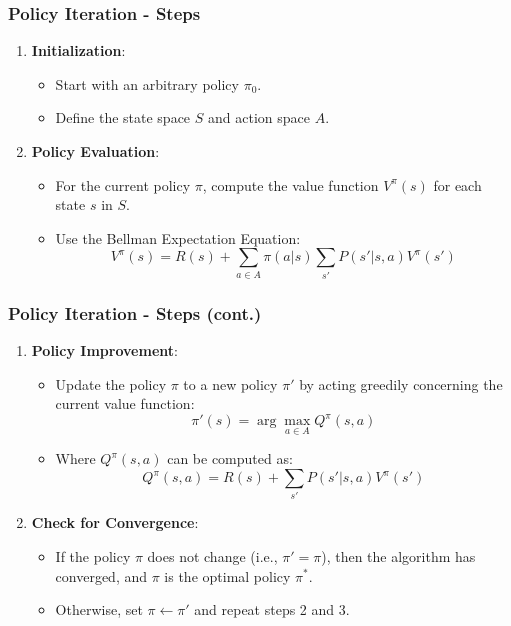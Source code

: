 \documentclass[aspectratio=169]{beamer}
\begin{document}
\begin{frame}[fragile]
    \frametitle{Policy Iteration - Steps}
    \begin{enumerate}
        \item \textbf{Initialization}:
            \begin{itemize}
                \item Start with an arbitrary policy \( \pi_0 \).
                \item Define the state space \( S \) and action space \( A \).
            \end{itemize}
        
        \item \textbf{Policy Evaluation}:
            \begin{itemize}
                \item For the current policy \( \pi \), compute the value function \( V^\pi(s) \) for each state \( s \) in \( S \).
                \item Use the Bellman Expectation Equation:
                \begin{equation}
                V^\pi(s) = R(s) + \sum_{a \in A} \pi(a|s) \sum_{s'} P(s'|s, a) V^\pi(s')
                \end{equation}
            \end{itemize}
    \end{enumerate}
\end{frame}

\begin{frame}[fragile]
    \frametitle{Policy Iteration - Steps (cont.)}
    \begin{enumerate}[resume]
        \item \textbf{Policy Improvement}:
            \begin{itemize}
                \item Update the policy \( \pi \) to a new policy \( \pi' \) by acting greedily concerning the current value function:
                \begin{equation}
                \pi'(s) = \arg\max_{a \in A} Q^\pi(s, a)
                \end{equation}
                \item Where \( Q^\pi(s, a) \) can be computed as:
                \begin{equation}
                Q^\pi(s, a) = R(s) + \sum_{s'} P(s'|s, a) V^\pi(s')
                \end{equation}
            \end{itemize}
        
        \item \textbf{Check for Convergence}:
            \begin{itemize}
                \item If the policy \( \pi \) does not change (i.e., \( \pi' = \pi \)), then the algorithm has converged, and \( \pi \) is the optimal policy \( \pi^* \).
                \item Otherwise, set \( \pi \leftarrow \pi' \) and repeat steps 2 and 3.
            \end{itemize}
    \end{enumerate}
\end{frame}
\end{document}
